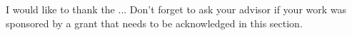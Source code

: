 I would like to thank the ...
Don't forget to ask your advisor if your work was sponsored by a grant that needs to be acknowledged in this section.  